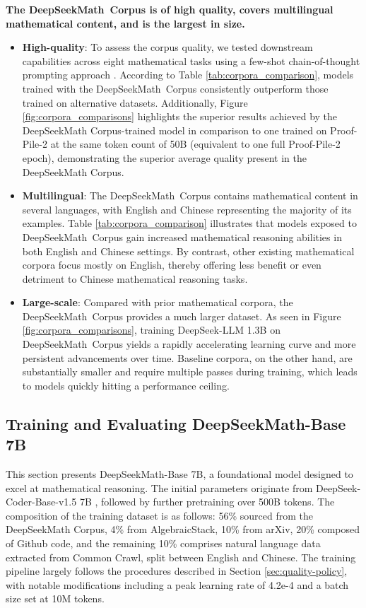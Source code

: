 \begin{itemize}[topsep=0pt]
\textbf{The DeepSeekMath~Corpus is of high quality, covers multilingual mathematical content, and is the largest in size.}

\begin{itemize}[topsep=0pt]
    \item \textbf{High-quality}:
    To assess the corpus quality, we tested downstream capabilities across eight mathematical tasks using a few-shot chain-of-thought prompting approach \cite{cot}. According to Table \ref{tab:corpora_comparison}, models trained with the DeepSeekMath~Corpus consistently outperform those trained on alternative datasets. Additionally, Figure \ref{fig:corpora_comparisons} highlights the superior results achieved by the DeepSeekMath Corpus-trained model in comparison to one trained on Proof-Pile-2 at the same token count of 50B (equivalent to one full Proof-Pile-2 epoch), demonstrating the superior average quality present in the DeepSeekMath Corpus.
    \item \textbf{Multilingual}:
    The DeepSeekMath~Corpus contains mathematical content in several languages, with English and Chinese representing the majority of its examples. Table \ref{tab:corpora_comparison} illustrates that models exposed to DeepSeekMath~Corpus gain increased mathematical reasoning abilities in both English and Chinese settings. By contrast, other existing mathematical corpora focus mostly on English, thereby offering less benefit or even detriment to Chinese mathematical reasoning tasks.
    \item \textbf{Large-scale}:
    Compared with prior mathematical corpora, the DeepSeekMath~Corpus provides a much larger dataset. As seen in Figure \ref{fig:corpora_comparisons}, training DeepSeek-LLM 1.3B on DeepSeekMath~Corpus yields a rapidly accelerating learning curve and more persistent advancements over time. Baseline corpora, on the other hand, are substantially smaller and require multiple passes during training, which leads to models quickly hitting a performance ceiling.
\end{itemize}

\subsection{Training and Evaluating DeepSeekMath-Base 7B}

This section presents DeepSeekMath-Base 7B, a foundational model designed to excel at mathematical reasoning. The initial parameters originate from DeepSeek-Coder-Base-v1.5 7B \citep{deepseek-coder}, followed by further pretraining over 500B tokens. The composition of the training dataset is as follows: 56\% sourced from the DeepSeekMath Corpus, 4\% from AlgebraicStack, 10\% from arXiv, 20\% composed of Github code, and the remaining 10\% comprises natural language data extracted from Common Crawl, split between English and Chinese. The training pipeline largely follows the procedures described in Section \ref{sec:quality-policy}, with notable modifications including a peak learning rate of 4.2e-4 and a batch size set at 10M tokens.


\end{itemize}
